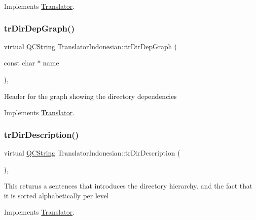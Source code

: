 Implements \mbox{\hyperlink{class_translator}{Translator}}.

\mbox{\label{class_translator_indonesian_a113500839044910b005d06b9567388aa}} 
\subsubsection{\texorpdfstring{trDirDepGraph()}{trDirDepGraph()}}
{\footnotesize\ttfamily virtual \mbox{\hyperlink{class_q_c_string}{Q\+C\+String}} Translator\+Indonesian\+::tr\+Dir\+Dep\+Graph (\begin{DoxyParamCaption}\item[{const char $\ast$}]{name }\end{DoxyParamCaption})\hspace{0.3cm}{\ttfamily [inline]}, {\ttfamily [virtual]}}

Header for the graph showing the directory dependencies 

Implements \mbox{\hyperlink{class_translator}{Translator}}.

\mbox{\label{class_translator_indonesian_a40c06db925621c70c01a85305333bbff}} 
\subsubsection{\texorpdfstring{trDirDescription()}{trDirDescription()}}
{\footnotesize\ttfamily virtual \mbox{\hyperlink{class_q_c_string}{Q\+C\+String}} Translator\+Indonesian\+::tr\+Dir\+Description (\begin{DoxyParamCaption}{ }\end{DoxyParamCaption})\hspace{0.3cm}{\ttfamily [inline]}, {\ttfamily [virtual]}}

This returns a sentences that introduces the directory hierarchy. and the fact that it is sorted alphabetically per level 

Implements \mbox{\hyperlink{class_translator}{Translator}}.

\mbox{\label{class_translator_indonesian_a0ad6dfb602e4a87ff07eec996efd1ef0}} 
